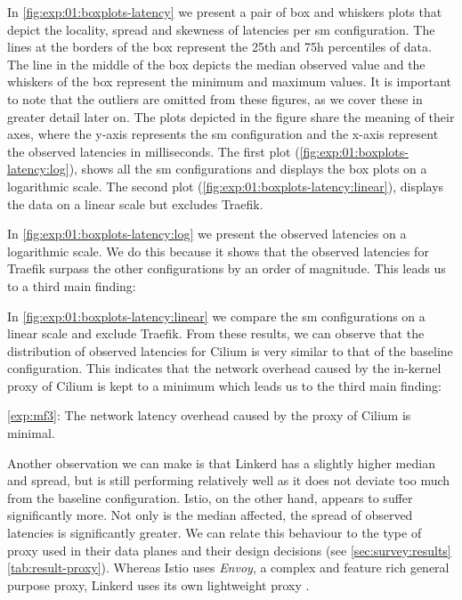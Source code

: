In \cref{fig:exp:01:boxplots-latency} we present a pair of box and whiskers plots that depict the locality, spread and skewness of latencies per \gls{sm} configuration. The lines at the borders of the box represent the 25th and 75h percentiles of data. The line in the middle of the box depicts the median observed value and the whiskers of the box represent the minimum and maximum values. It is important to note that the outliers are omitted from these figures, as we cover these in greater detail later on. The plots depicted in the figure share the meaning of their axes, where the y-axis represents the \gls{sm} configuration and the x-axis represent the observed latencies in milliseconds. The first plot (\cref{fig:exp:01:boxplots-latency:log}), shows all the \gls{sm} configurations and displays the box plots on a logarithmic scale. The second plot (\cref{fig:exp:01:boxplots-latency:linear}), displays the data on a linear scale but excludes Traefik.

In \cref{fig:exp:01:boxplots-latency:log} we present the observed latencies on a logarithmic scale. We do this because it shows that the observed latencies for Traefik surpass the other configurations by an order of magnitude. This leads us to a third main finding:



In \cref{fig:exp:01:boxplots-latency:linear} we compare the \gls{sm} configurations on a linear scale and exclude Traefik. From these results, we can observe that the distribution of observed latencies for Cilium is very similar to that of the baseline configuration. This indicates that the network overhead caused by the in-kernel proxy of Cilium is kept to a minimum which leads us to the third main finding:

\begin{shaded*}
    \noindent
    \ref{exp:mf3}: 
    The network latency overhead caused by the proxy of Cilium is minimal.
\end{shaded*}

Another observation we can make is that Linkerd has a slightly higher median and spread, but is still performing relatively well as it does not deviate too much from the baseline configuration. Istio, on the other hand, appears to suffer significantly more. Not only is the median affected, the spread of observed latencies is significantly greater. We can relate this behaviour to the type of proxy used in their data planes and their design decisions (see \cref{sec:survey:results} \cref{tab:result-proxy}). Whereas Istio uses \textit{Envoy}, a complex and feature rich general purpose proxy, Linkerd uses its own lightweight proxy \cite{linkerd-no-envoy}.


